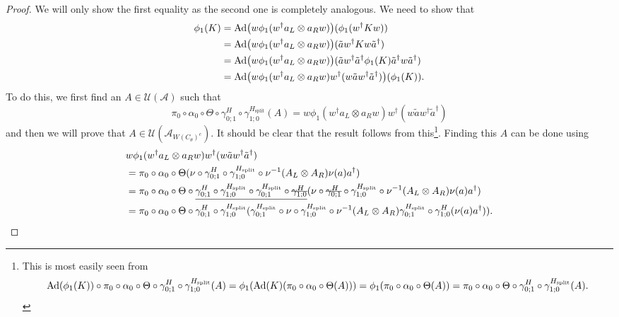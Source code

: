 \documentclass[12pt,a4paper,twoside]{article}
\newcommand{\stkout}[1]{\ifmmode\text{\sout{\ensuremath{#1}}}\else\sout{#1}\fi}
\let\originalleft\left
\let\originalright\right
\renewcommand{\left}{\mathopen{}\mathclose\bgroup\originalleft}
\renewcommand{\right}{\aftergroup\egroup\originalright}
\newcommand{\UU}{\mathcal U}
\renewcommand{\AA}{\mathcal A}
\newcommand{\Ad}[1]{\textrm{Ad}\left(#1\right)}
\theoremstyle{definition}
\numberwithin{equation}{section}
\begin{document}
\begin{proof}
	We will only show the first equality as the second one is completely analogous. We need to show that
	\begin{align}
		\phi_1(K)&=\Ad{w\phi_1(w^\dagger a_L\otimes a_R w)}(\phi_1(w^\dagger K w))\\
		&=\Ad{w\phi_1(w^\dagger a_L\otimes a_R w)}(\tilde{a}w^\dagger K w\tilde{a}^\dagger)\\
		&=\Ad{w\phi_1(w^\dagger a_L\otimes a_R w)}(\tilde{a}w^\dagger \tilde{a}^\dagger \phi_1(K) \tilde{a}^\dagger w\tilde{a}^\dagger)\\
		&=\Ad{w\phi_1(w^\dagger a_L\otimes a_R w)w^\dagger (w \tilde{a}w^\dagger \tilde{a}^\dagger)}(\phi_1(K)).
	\end{align}
	To do this, we first find an $A\in\UU(\AA)$ such that
	\begin{equation}
		\pi_0\circ\alpha_0\circ\Theta\circ\gamma^H_{0;1}\circ\gamma^{H_\text{split}}_{1;0}(A)=w\phi_1(w^\dagger a_L\otimes a_R w)w^\dagger (w \tilde{a}w^\dagger \tilde{a}^\dagger)
	\end{equation}
	and then we will prove that $A\in\UU(\AA_{W(C_\theta)^c})$. It should be clear that the result follows from this\footnote{This is most easily seen from\begin{equation}
			\Ad{\phi_1(K)}\circ\pi_0\circ\alpha_0\circ\Theta\circ\gamma^H_{0;1}\circ\gamma^{H_\text{split}}_{1;0}(A)=\phi_1(\Ad{K}(\pi_0\circ\alpha_0\circ\Theta(A)))=\phi_1(\pi_0\circ\alpha_0\circ\Theta(A))=\pi_0\circ\alpha_0\circ\Theta\circ\gamma^H_{0;1}\circ\gamma^{H_\text{split}}_{1;0}(A).
	\end{equation}}. Finding this $A$ can be done using
	\begin{align}
		&w\phi_1(w^\dagger a_L\otimes a_R w)w^\dagger (w \tilde{a}w^\dagger \tilde{a}^\dagger)\\
		&=\pi_0\circ\alpha_0\circ\Theta(\nu\circ\gamma^H_{0;1}\circ\gamma^{H_\text{split}}_{1;0}\circ\nu^{-1}(A_L\otimes A_R)\nu(a)a^\dagger)\\
		&=\pi_0\circ\alpha_0\circ\Theta\circ\underline{\gamma^H_{0;1}\circ\gamma^{H_\text{split}}_{1;0}\circ\gamma^{H_\text{split}}_{0;1}\circ\stkout{\gamma^H_{1;0}}}(\nu\circ\stkout{\gamma^H_{0;1}}\circ\gamma^{H_\text{split}}_{1;0}\circ\nu^{-1}(A_L\otimes A_R)\nu(a)a^\dagger)\\
		&=\pi_0\circ\alpha_0\circ\Theta\circ\gamma^H_{0;1}\circ\gamma^{H_\text{split}}_{1;0}(\gamma^{H_\text{split}}_{0;1}\circ\nu\circ\gamma^{H_\text{split}}_{1;0}\circ\nu^{-1}(A_L\otimes A_R)\gamma^{H_\text{split}}_{0;1}\circ\gamma^H_{1;0}(\nu(a)a^\dagger)).

\end{align}
\end{proof}
\end{document}
